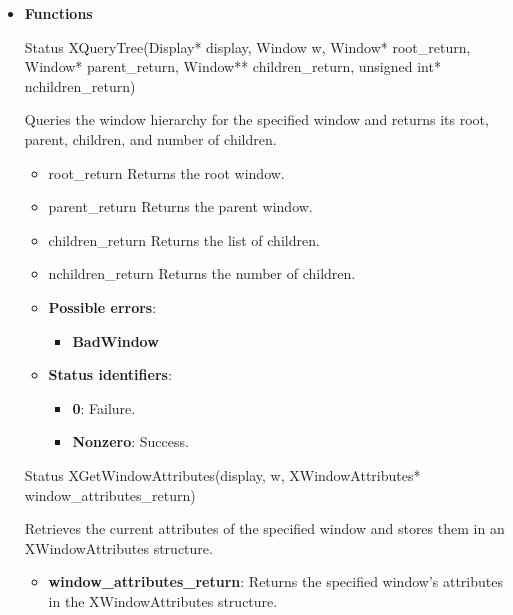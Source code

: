 \documentclass{report}
\begin{document}
\begin{itemize}
        \item \textbf{Functions}
            \begin{cppcode}
            Status XQueryTree(Display* display, Window w, Window* root_return, Window* parent_return, Window** children_return, unsigned int* nchildren_return)
            \end{cppcode}
            \bigbreak \noindent
            Queries the window hierarchy for the specified window and returns its root, parent, children, and number of children.
            \begin{itemize}
                \item root\_return Returns the root window.
                \item parent\_return Returns the parent window.
                \item children\_return Returns the list of children.
                \item nchildren\_return Returns the number of children.
            \end{itemize}
            \begin{itemize}
                \item \textbf{Possible errors}:
                    \begin{itemize}
                        \item \textbf{BadWindow}
                    \end{itemize}
                \item \textbf{Status identifiers}:
                    \begin{itemize}
                        \item \textbf{0}: Failure.
                        \item \textbf{Nonzero}: Success.
                    \end{itemize}
            \end{itemize}

            \begin{cppcode}
                Status XGetWindowAttributes(display, w, XWindowAttributes* window_attributes_return)
            \end{cppcode}
            \bigbreak \noindent
            Retrieves the current attributes of the specified window and stores them in an XWindowAttributes structure.

            \begin{itemize}
                \item \textbf{window\_attributes\_return}: Returns the specified window’s attributes in the XWindowAttributes structure.
            \end{itemize}


\end{itemize}
\end{document}
